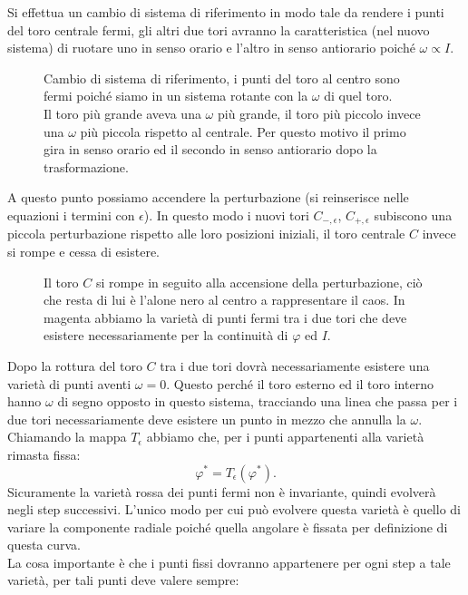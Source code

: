 Si effettua un cambio di sistema di riferimento in modo tale da rendere i punti del toro centrale fermi, gli altri due tori avranno la caratteristica (nel nuovo sistema) di ruotare uno in senso orario e l'altro in senso antiorario poiché $\omega\propto I$.
\begin{figure}[H]
    \centering
    \caption{\scriptsize Cambio di sistema di riferimento, i punti del toro al centro sono fermi poiché siamo in un sistema rotante con la $\omega$ di quel toro. \\
    Il toro più grande aveva una $\omega$ più grande, il toro più piccolo invece una $\omega$ più piccola rispetto al centrale. Per questo motivo il primo gira in senso orario ed il secondo in senso antiorario dopo la trasformazione.}
    \label{fig:19_tori}
\end{figure}
\noindent
A questo punto possiamo accendere la perturbazione (si reinserisce nelle equazioni i termini con $\epsilon$). In questo modo i nuovi tori $C_{-,\epsilon}$, $C_{+, \epsilon}$ subiscono una piccola perturbazione rispetto alle loro posizioni iniziali, il toro centrale $C$ invece si rompe e cessa di esistere.
\begin{figure}[H]
    \centering
    \caption{\scriptsize Il toro $C$ si rompe in seguito alla accensione della perturbazione, ciò che resta di lui è l'alone nero al centro a rappresentare il caos. In magenta abbiamo la varietà di punti fermi tra i due tori che deve esistere necessariamente per la continuità di $\varphi$ ed $I$.}
    \label{fig:19_tori_rotto}
\end{figure}
\noindent
Dopo la rottura del toro $C$  tra i due tori dovrà necessariamente esistere una varietà di punti aventi $\omega =0$. Questo perché il toro esterno ed il toro interno hanno $\omega$  di segno opposto in questo sistema, tracciando una linea che passa per i due tori necessariamente deve esistere un punto in mezzo che annulla la $\omega$. \\
Chiamando la mappa $T_{\epsilon}$ abbiamo che, per i punti appartenenti alla varietà rimasta fissa:
\[
    \varphi^* = T_{\epsilon}(\varphi^*)
.\] 
Sicuramente la varietà rossa dei punti fermi non è invariante, quindi evolverà negli step successivi. L'unico modo per cui può evolvere questa varietà è quello di variare la componente radiale poiché quella angolare è fissata per definizione di questa curva. \\
La cosa importante è che i punti fissi dovranno appartenere per ogni step a tale varietà, per tali punti deve valere sempre:
